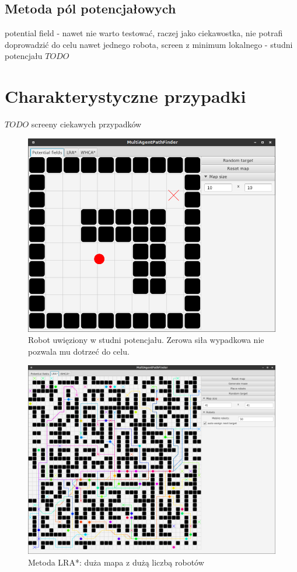 \subsection{Metoda pól potencjałowych}
potential field - nawet nie warto testować, raczej jako ciekawostka, nie potrafi doprowadzić do celu nawet jednego robota, screen z minimum lokalnego - studni potencjału
$TODO$

\section{Charakterystyczne przypadki}
$TODO$ screeny ciekawych przypadków

\begin{figure}
	\centering
	\includegraphics[width=0.8\columnwidth]{img/robopath/field-potential-hole}
	\caption{Robot uwięziony w studni potencjału. Zerowa siła wypadkowa nie pozwala mu dotrzeć do celu.}
	\label{fig:test-field-potential-hole}
\end{figure}

\begin{figure}
	\centering
	\includegraphics[width=0.8\columnwidth]{img/robopath/lra-bigmap}
	\caption{Metoda LRA*: duża mapa z dużą liczbą robotów}
	\label{fig:test-lra-bigmap}
\end{figure}

